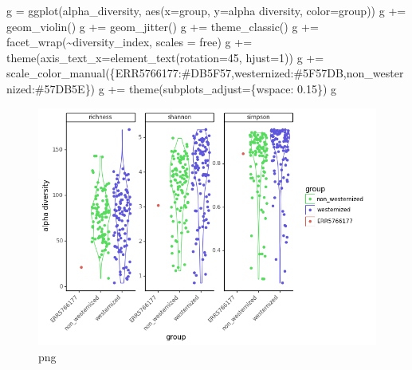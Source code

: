 \documentclass[
  letterpaper,
]{book}
\newenvironment{Shaded}{}{}
\newcommand{\DecValTok}[1]{\textcolor[rgb]{0.00,0.36,0.77}{#1}}
\newcommand{\FloatTok}[1]{\textcolor[rgb]{0.00,0.36,0.77}{#1}}
\newcommand{\NormalTok}[1]{\textcolor[rgb]{0.14,0.16,0.18}{#1}}
\newcommand{\OperatorTok}[1]{\textcolor[rgb]{0.14,0.16,0.18}{#1}}
\newcommand{\StringTok}[1]{\textcolor[rgb]{0.01,0.18,0.38}{#1}}
\begin{document}
\begin{Shaded}
\begin{Highlighting}[]
\NormalTok{g }\OperatorTok{=}\NormalTok{ ggplot(alpha\_diversity, aes(x}\OperatorTok{=}\StringTok{\textquotesingle{}group\textquotesingle{}}\NormalTok{, y}\OperatorTok{=}\StringTok{\textquotesingle{}alpha diversity\textquotesingle{}}\NormalTok{, color}\OperatorTok{=}\StringTok{\textquotesingle{}group\textquotesingle{}}\NormalTok{))}
\NormalTok{g }\OperatorTok{+=}\NormalTok{ geom\_violin()}
\NormalTok{g }\OperatorTok{+=}\NormalTok{ geom\_jitter()}
\NormalTok{g }\OperatorTok{+=}\NormalTok{ theme\_classic()}
\NormalTok{g }\OperatorTok{+=}\NormalTok{ facet\_wrap(}\StringTok{\textquotesingle{}\textasciitilde{}diversity\_index\textquotesingle{}}\NormalTok{, scales }\OperatorTok{=} \StringTok{\textquotesingle{}free\textquotesingle{}}\NormalTok{)}
\NormalTok{g }\OperatorTok{+=}\NormalTok{ theme(axis\_text\_x}\OperatorTok{=}\NormalTok{element\_text(rotation}\OperatorTok{=}\DecValTok{45}\NormalTok{, hjust}\OperatorTok{=}\DecValTok{1}\NormalTok{))}
\NormalTok{g }\OperatorTok{+=}\NormalTok{ scale\_color\_manual(\{}\StringTok{\textquotesingle{}ERR5766177\textquotesingle{}}\NormalTok{:}\StringTok{\textquotesingle{}\#DB5F57\textquotesingle{}}\NormalTok{,}\StringTok{\textquotesingle{}westernized\textquotesingle{}}\NormalTok{:}\StringTok{\textquotesingle{}\#5F57DB\textquotesingle{}}\NormalTok{,}\StringTok{\textquotesingle{}non\_westernized\textquotesingle{}}\NormalTok{:}\StringTok{\textquotesingle{}\#57DB5E\textquotesingle{}}\NormalTok{\})}
\NormalTok{g }\OperatorTok{+=}\NormalTok{ theme(subplots\_adjust}\OperatorTok{=}\NormalTok{\{}\StringTok{\textquotesingle{}wspace\textquotesingle{}}\NormalTok{: }\FloatTok{0.15}\NormalTok{\})}
\NormalTok{g}
\end{Highlighting}
\end{Shaded}

\begin{figure}

{\centering \includegraphics{assets/images/chapters/taxonomic-profiling/analysis_91_1.png}

}

\caption{png}

\end{figure}
\end{document}

